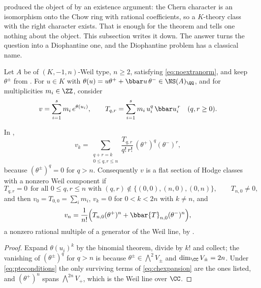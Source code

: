  produced the object of  by an
existence argument: the Chern character is an isomorphism onto the Chow ring
with rational coefficients, so a $K$-theory class with the right character
exists. That is enough for the theorem and tells one nothing about the object.
This subsection writes it down. The answer turns the question into a
Diophantine one, and the Diophantine problem has a classical name.

\begin{setupenv}\label{setup:pte}
Let $A$ be of $(K,-1,n)$-Weil type, $n\ge2$, satisfying
\eqref{eq:noextranorm}, and keep $\theta^{\pm}$ from
. For $u\in K$ with $\theta(u)=u\theta^{+}+\bbar
u\,\theta^{-}\in\NS(A)_{\QQ}$, and for multiplicities $m_{i}\in\ZZ$, consider
\[
  v=\sum_{i=1}^{s}m_{i}\,e^{\theta(u_{i})},
  \qquad
  T_{q,r}=\sum_{i=1}^{s}m_{i}\,u_{i}^{q}\,\bbar u_{i}^{\,r}
  \quad (q,r\ge0).
\]
\end{setupenv}

\begin{proposition}
\label{prop:chintermsofu}
In ,
\begin{equation}\label{eq:chexpansion}
  v_{k}
  =\sum_{\substack{q+r=k\\ 0\le q,r\le n}}
    \frac{T_{q,r}}{q!\,r!}\,(\theta^{+})^{q}(\theta^{-})^{r},
\end{equation}
because $(\theta^{\pm})^{q}=0$ for $q>n$. Consequently $v$ is a flat section
of Hodge classes with a nonzero Weil component if
\begin{equation}\label{eq:pteconditions}
  T_{q,r}=0\ \ \text{for all } 0\le q,r\le n \text{ with }
  (q,r)\notin\{(0,0),(n,0),(0,n)\},
  \qquad T_{n,0}\ne0,
\end{equation}
and then $v_{0}=T_{0,0}=\sum_{i}m_{i}$, $v_{k}=0$ for $0<k<2n$ with $k\ne n$,
and
\[
  v_{n}=\frac{1}{n!}\Bigl(T_{n,0}(\theta^{+})^{n}
        +\bbar{T}_{n,0}(\theta^{-})^{n}\Bigr),
\]
a nonzero rational multiple of a generator of the Weil line, by
.
\end{proposition}

\begin{proof}
Expand $\theta(u_{i})^{k}$ by the binomial theorem, divide by $k!$ and collect;
the vanishing of $(\theta^{\pm})^{q}$ for $q>n$ is because
$\theta^{\pm}\in\bigwedge^{2}V_{\pm}$ and $\dim_{\CC}V_{\pm}=2n$. Under
\eqref{eq:pteconditions} the only surviving terms of \eqref{eq:chexpansion}
are the ones listed, and $(\theta^{+})^{n}$ spans $\bigwedge^{2n}V_{+}$, which
is the Weil line over $\CC$.
\end{proof}

